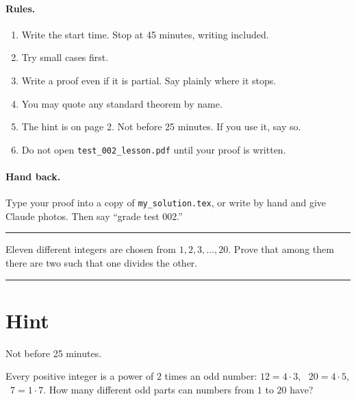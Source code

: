 \documentclass[11pt]{article}
\begin{document}

\paragraph{Rules.}
\begin{enumerate}
  \item Write the start time. Stop at 45 minutes, writing included.
  \item Try small cases first.
  \item Write a proof even if it is partial. Say plainly where it stops.
  \item You may quote any standard theorem by name.
  \item The hint is on page 2. Not before 25 minutes. If you use it, say so.
  \item Do not open \texttt{test\_002\_lesson.pdf} until your proof is written.
\end{enumerate}

\paragraph{Hand back.} Type your proof into a copy of \texttt{my\_solution.tex}, or write by hand and give Claude photos. Then say ``grade test 002.''

\vspace{10pt}\hrule\vspace{10pt}

\begin{problem}
Eleven different integers are chosen from $1, 2, 3, \dots, 20$. Prove that among them there are two such that one divides the other.
\end{problem}

\vspace{10pt}\hrule

\clearpage
\section*{Hint}
Not before 25 minutes.

\spoilerspace
\begin{hint}
Every positive integer is a power of $2$ times an odd number: $12 = 4 \cdot 3$, \ $20 = 4 \cdot 5$, \ $7 = 1 \cdot 7$. How many different odd parts can numbers from $1$ to $20$ have?
\end{hint}
\end{document}
